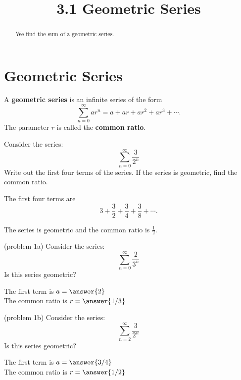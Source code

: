 \documentclass{ximera}
\title{3.1 Geometric Series}
\begin{document}
\begin{abstract}
We find the sum of a geometric series.
\end{abstract}

\maketitle

\section{Geometric Series}

\begin{definition} A \textbf{geometric series} is an infinite series of the form
\[
\sum_{n=0}^\infty ar^n = a + ar + ar^2 + ar^3 + \cdots.
\]
The parameter $r$ is called the \textbf{common ratio}.
\end{definition}

\begin{example}[example 1]
Consider the series:
\[
 \sum_{n=0}^\infty \frac{3}{2^n} 
 \]
 Write out the first four terms of the series. If the series is geometric, find the common ratio.
 
 The first four terms are \[
 3 + \frac32 + \frac34 + \frac38 + \cdots.
 \]

 The series is geometric and the common ratio is $\frac12$.
 \end{example}
 
 

\begin{problem}(problem 1a)
 Consider the series:
 \[
 \sum_{n=0}^\infty \frac{2}{3^n} 
 \]
 Is this series geometric?
 \begin{multipleChoice}
 \end{multipleChoice}
 
 The first term is $a = \answer{2}$\\
 The common ratio is $r = \answer{1/3}$
 \end{problem}
 
 
 \begin{problem}(problem 1b)
 Consider the series:
 \[
 \sum_{n=2}^\infty \frac{3}{2^n} 
 \]
 Is this series geometric?
 \begin{multipleChoice}
 \end{multipleChoice}
 
 The first term is $a = \answer{3/4}$\\
 The common ratio is $r = \answer{1/2}$
 \end{problem}
 
\end{document}
